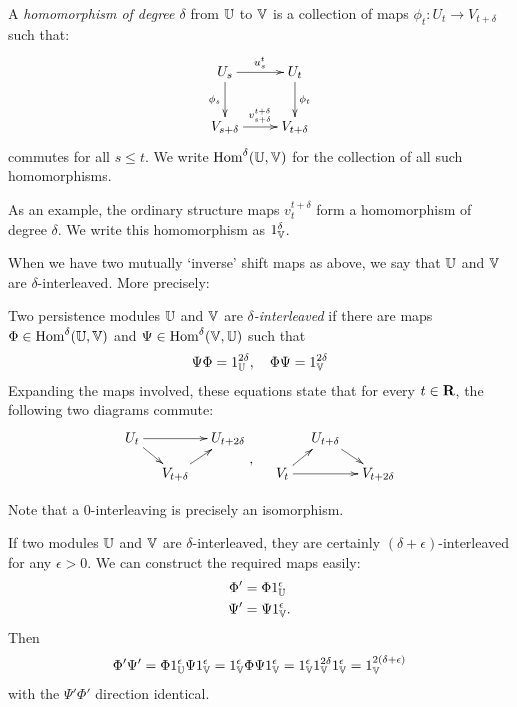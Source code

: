 \begin{definition}
A \emph{homomorphism of degree $\delta$} from $\mathbb{U}$ to $\mathbb{V}$ is a collection of maps $\phi_t : U_t \to V_{t+\delta}$ such that:
\begin{displaymath}
\xymatrix{
U_s \ar[d]_{\phi_s} \ar[r]^{u_s^t} & U_t \ar[d]^{\phi_t}\\
V_{s+\delta} \ar[r]^{v_{s+\delta}^{t+\delta}} & V_{t+\delta}
}
\end{displaymath}
commutes for all $s \leq t$. We write $\operatorname{Hom}^\delta(\mathbb{U}, \mathbb{V})$ for the collection of all such homomorphisms.
\end{definition}

As an example, the ordinary structure maps $v_t^{t+\delta}$ form a homomorphism of degree $\delta$. We write this homomorphism as $1_{\mathbb{V}}^\delta$.

When we have two mutually `inverse' shift maps as above, we say that $\mathbb{U}$ and $\mathbb{V}$ are $\delta$-interleaved. More precisely:

\begin{definition}
Two persistence modules $\mathbb{U}$ and $\mathbb{V}$ are \emph{$\delta$-interleaved} if there are maps $\Phi \in \operatorname{Hom}^\delta(\mathbb{U}, \mathbb{V})$ and $\Psi \in \operatorname{Hom}^\delta(\mathbb{V}, \mathbb{U})$ such that
\begin{align*}
\Psi \Phi = 1_{\mathbb{U}}^{2\delta}, \quad \Phi \Psi = 1_{\mathbb{V}}^{2\delta}
\end{align*}
Expanding the maps involved, these equations state that for every $t \in \mathbf{R}$, the following two diagrams commute:
\begin{align*}
\xymatrix@=1em{
U_t \ar[dr] \ar[rr] & & U_{t+2\delta} \\
& V_{t+\delta} \ar[ur]
}
\text{\raisebox{-15pt}{, }}
\quad
\xymatrix@=1em{
& U_{t+\delta} \ar[dr] \\
V_t \ar[ur] \ar[rr] & & V_{t+2\delta}
}
\end{align*}
\end{definition}

Note that a $0$-interleaving is precisely an isomorphism.

If two modules $\mathbb{U}$ and $\mathbb{V}$ are $\delta$-interleaved, they are certainly $(\delta + \epsilon)$-interleaved for any $\epsilon > 0$. We can construct the required maps easily:
\begin{align*}
\Phi' &= \Phi 1_{\mathbb{U}}^\epsilon \\
\Psi' &= \Psi 1_{\mathbb{V}}^\epsilon.
\end{align*}
Then
\begin{align*}
\Phi' \Psi' = \Phi 1_{\mathbb{U}}^\epsilon \Psi 1_{\mathbb{V}}^\epsilon = 1_{\mathbb{V}}^\epsilon \Phi \Psi 1_{\mathbb{V}}^\epsilon = 1_{\mathbb{V}}^\epsilon 1_{\mathbb{V}}^{2\delta} 1_{\mathbb{V}}^\epsilon = 1_{\mathbb{V}}^{2(\delta + \epsilon)}
\end{align*}
with the $\Psi' \Phi'$ direction identical.

